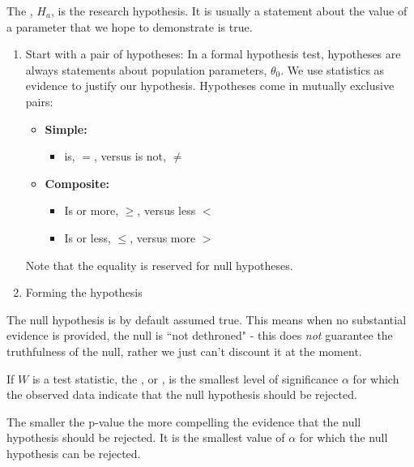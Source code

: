\documentclass[12pt, a4paper, twoside, openright, titlepage]{book}
\begin{document}
\begin{defn}{}{}
    The , $H_a$, is the research hypothesis. It is usually a statement about the value of a parameter that we hope to demonstrate is true.
\end{defn}

\begin{proc}{}{}
    \leavevmode
    \begin{enumerate}
        \item Start with a pair of hypotheses: In a formal hypothesis test, hypotheses are always statements about population parameters, $\theta_0$. We use statistics as evidence to justify our hypothesis. Hypotheses come in mutually exclusive pairs: \begin{itemize}
        \item \textbf{Simple:} \begin{itemize}
                \item is, $=$, versus is not, $\neq$
        \end{itemize}
        \item \textbf{Composite:} \begin{itemize}
                \item Is or more, $\geq$, versus less $<$
                \item Is or less, $\leq$, versus more $>$
        \end{itemize}
        \end{itemize}
        Note that the equality is reserved for null hypotheses.
        \item Forming the hypothesis
    \end{enumerate}
\end{proc}

\begin{rmk}{}{}
    The null hypothesis is by default assumed true. This means when no substantial evidence is provided, the null is ``not dethroned" - this does \emph{not} guarantee the truthfulness of the null, rather we just can't discount it at the moment.
\end{rmk}


\begin{defn}{}{}
    If $W$ is a test statistic, the , or , is the smallest level of significance $\alpha$ for which the observed data indicate that the null hypothesis should be rejected.
\end{defn}

The smaller the p-value the more compelling the evidence that the null hypothesis should be rejected. It is the smallest value of $\alpha$ for which the null hypothesis can be rejected. 
\end{document}
